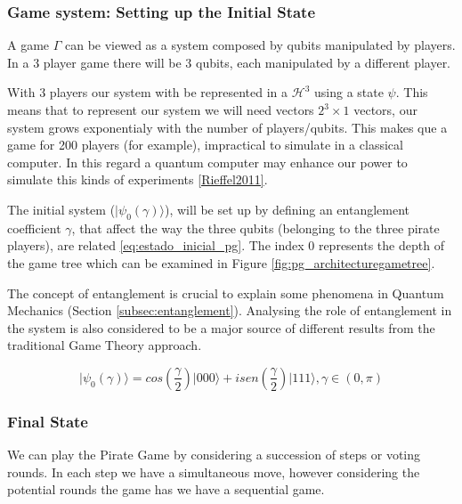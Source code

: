 \subsubsection{Game system: Setting up the Initial State}
\label{subsec:pirates_initialstate}

A game $\Gamma$ can be viewed as a system composed by qubits manipulated by players. In a $3$ player game there will be $3$ qubits, each manipulated by a different player. 

With $3$ players our system with be represented in a $\mathcal{H}^{3}$ using a state $\psi$. This means that to represent our system we will need vectors $2^{3}\times 1$ vectors, our system grows exponentialy with the number of players/qubits. This makes que a game for 200 players (for example), impractical to simulate in a classical computer. In this regard a quantum computer may enhance our power to simulate this kinds of experiments \ref{Rieffel2011}.


The initial system ($\vert \psi_{0}(\gamma) \rangle$), will be set up by defining an entanglement coefficient $\gamma$, that affect the way the three qubits (belonging to the three pirate players), are related \ref{eq:estado_inicial_pg}. The index $0$ represents the depth of the game tree which can be examined in Figure \ref{fig:pg_architecturegametree}.


The concept of entanglement is crucial to explain some phenomena in Quantum Mechanics (Section \ref{subsec:entanglement}). Analysing the role of entanglement in the system is also considered to be a major source of different results from the traditional Game Theory approach\cite{Fra2011a}\cite{Fra2011}\cite{Letters2002}\cite{Khan2011}\cite{Ricketts2006}. 
 
\begin{equation}
\label{eq:estado_inicial_pg}
\vert \psi_{0}(\gamma) \rangle= cos(\frac{ \gamma}{2})\vert 000\rangle+ isen(\frac{\gamma}{2})\vert 111 \rangle, \gamma \in (0,\pi)
\end{equation}



\subsubsection{Final State}
\label{subsec:pirates_finalstate}

We can play the Pirate Game by considering a succession of steps or voting rounds. In each step we have a simultaneous move, however considering the potential rounds the game has we have a sequential game. 

